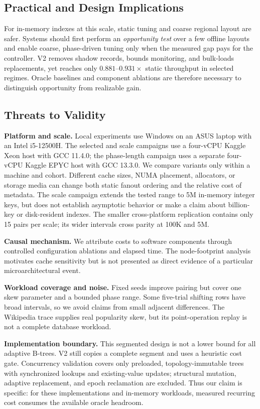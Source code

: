 \documentclass[sigconf,review,anonymous]{acmart}
\begin{document}
\subsection{Practical and Design Implications}

For in-memory indexes at this scale, static tuning and coarse regional layout
are safer.  Systems should first perform an \emph{opportunity test} over a few
offline layouts and enable coarse, phase-driven tuning only when the measured
gap pays for the controller.  V2 removes shadow records, bounds monitoring, and
bulk-loads replacements, yet reaches only \(0.881\)--\(0.931\times\) static
throughput in selected regimes.  Oracle baselines and component ablations are
therefore necessary to distinguish opportunity from realizable gain.

\subsection{Threats to Validity}

\textbf{Platform and scale.}  Local experiments use Windows on an ASUS laptop
with an Intel i5-12500H.  The selected and scale campaigns use a four-vCPU
Kaggle Xeon host with GCC 11.4.0; the phase-length campaign uses a separate
four-vCPU Kaggle EPYC host with GCC 13.3.0.  We compare variants only within a
machine and cohort.  Different cache sizes, NUMA placement, allocators, or
storage media can change both static fanout ordering and the relative cost of
metadata.  The scale campaign extends the tested range to 5M in-memory integer
keys, but does not establish asymptotic behavior or make a claim about
billion-key or disk-resident indexes.  The smaller cross-platform replication
contains only 15 pairs per scale; its wider intervals cross parity at 100K and
5M.

\textbf{Causal mechanism.}  We attribute costs to software components through
controlled configuration ablations and elapsed time.  The node-footprint
analysis motivates cache sensitivity but is not presented as direct evidence
of a particular microarchitectural event.

\textbf{Workload coverage and noise.}  Fixed seeds improve pairing but cover
one skew parameter and a bounded phase range.  Some five-trial shifting rows
have broad intervals, so we avoid claims from small adjacent differences.  The
Wikipedia trace supplies real popularity skew, but its point-operation replay
is not a complete database workload.

\textbf{Implementation boundary.}  This segmented design is not a lower bound
for all adaptive B-trees.  V2 still copies a complete segment and uses a
heuristic cost gate.  Concurrency validation covers only preloaded,
topology-immutable trees with synchronized lookups and existing-value updates;
structural mutation, adaptive replacement, and epoch reclamation are excluded.
Thus our claim is specific: for these implementations and in-memory workloads,
measured recurring cost consumes the available oracle headroom.
\end{document}
